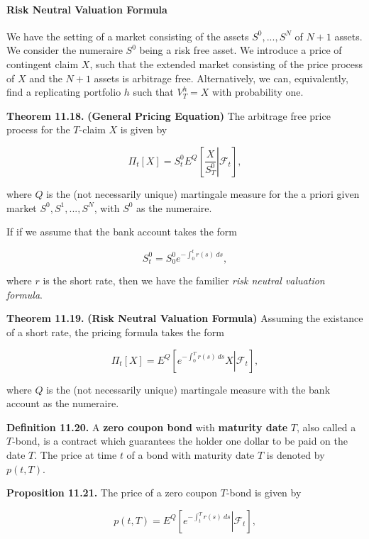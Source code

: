 \documentclass[
]{article}
\begin{document}
\hypertarget{risk-neutral-valuation-formula}{%
\paragraph{Risk Neutral Valuation
Formula}\label{risk-neutral-valuation-formula}}

We have the setting of a market consisting of the assets \(S^0,...,S^N\)
of \(N+1\) assets. We consider the numeraire \(S^0\) being a risk free
asset. We introduce a price of contingent claim \(X\), such that the
extended market consisting of the price process of \(X\) and the \(N+1\)
assets is arbitrage free. Alternatively, we can, equivalently, find a
replicating portfolio \(h\) such that \(V^h_T=X\) with probability one.

\textbf{Theorem 11.18.} \textbf{(General Pricing Equation)} The
arbitrage free price process for the \(T\)-claim \(X\) is given by

\[
\Pi_t[X]=S_t^0E^Q\left[\left.\frac{X}{S^0_T}\right\vert \mathcal{F}_t\right],
\]

where \(Q\) is the (not necessarily unique) martingale measure for the a
priori given market \(S^0,S^1,...,S^N\), with \(S^0\) as the numeraire.

If if we assume that the bank account takes the form

\[
S_t^0=S_0^0e^{-\int_0^tr(s)\ ds},
\]

where \(r\) is the short rate, then we have the familier \emph{risk
neutral valuation formula}.

\textbf{Theorem 11.19.} \textbf{(Risk Neutral Valuation Formula)}
Assuming the existance of a short rate, the pricing formula takes the
form

\[
\Pi_t[X]=E^Q\left[\left.e^{-\int_0^Tr(s)\ ds}X\right\vert \mathcal{F}_t\right],
\]

where \(Q\) is the (not necessarily unique) martingale measure with the
bank account as the numeraire.

\textbf{Definition 11.20.} A \textbf{zero coupon bond} with
\textbf{maturity date} \(T\), also called a \(T\)-bond, is a contract
which guarantees the holder one dollar to be paid on the date \(T\). The
price at time \(t\) of a bond with maturity date \(T\) is denoted by
\(p(t,T)\).

\textbf{Proposition 11.21.} The price of a zero coupon \(T\)-bond is
given by

\[
p(t,T)=E^Q\left[\left.e^{-\int_t^Tr(s)\ ds}\right\vert \mathcal{F}_t\right],
\]
\end{document}
